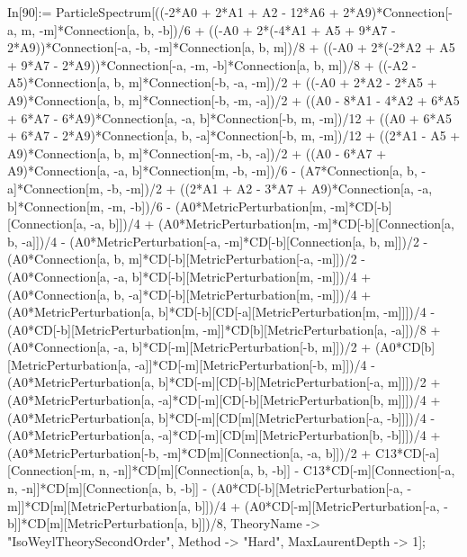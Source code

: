 In[90]:= ParticleSpectrum[((-2*A0 + 2*A1 + A2 - 12*A6 + 2*A9)*Connection[-a, m, -m]*Connection[a, b, -b])/6 + ((-A0 + 2*(-4*A1 + A5 + 9*A7 - 2*A9))*Connection[-a, -b, -m]*Connection[a, b, m])/8 + ((-A0 + 2*(-2*A2 + A5 + 9*A7 - 2*A9))*Connection[-a, -m, -b]*Connection[a, b, m])/8 + ((-A2 - A5)*Connection[a, b, m]*Connection[-b, -a, -m])/2 + ((-A0 + 2*A2 - 2*A5 + A9)*Connection[a, b, m]*Connection[-b, -m, -a])/2 + ((A0 - 8*A1 - 4*A2 + 6*A5 + 6*A7 - 6*A9)*Connection[a, -a, b]*Connection[-b, m, -m])/12 + ((A0 + 6*A5 + 6*A7 - 2*A9)*Connection[a, b, -a]*Connection[-b, m, -m])/12 + ((2*A1 - A5 + A9)*Connection[a, b, m]*Connection[-m, -b, -a])/2 + ((A0 - 6*A7 + A9)*Connection[a, -a, b]*Connection[m, -b, -m])/6 - (A7*Connection[a, b, -a]*Connection[m, -b, -m])/2 + ((2*A1 + A2 - 3*A7 + A9)*Connection[a, -a, b]*Connection[m, -m, -b])/6 - (A0*MetricPerturbation[m, -m]*CD[-b][Connection[a, -a, b]])/4 + (A0*MetricPerturbation[m, -m]*CD[-b][Connection[a, b, -a]])/4 - (A0*MetricPerturbation[-a, -m]*CD[-b][Connection[a, b, m]])/2 - (A0*Connection[a, b, m]*CD[-b][MetricPerturbation[-a, -m]])/2 - (A0*Connection[a, -a, b]*CD[-b][MetricPerturbation[m, -m]])/4 + (A0*Connection[a, b, -a]*CD[-b][MetricPerturbation[m, -m]])/4 + (A0*MetricPerturbation[a, b]*CD[-b][CD[-a][MetricPerturbation[m, -m]]])/4 - (A0*CD[-b][MetricPerturbation[m, -m]]*CD[b][MetricPerturbation[a, -a]])/8 + (A0*Connection[a, -a, b]*CD[-m][MetricPerturbation[-b, m]])/2 + (A0*CD[b][MetricPerturbation[a, -a]]*CD[-m][MetricPerturbation[-b, m]])/4 - (A0*MetricPerturbation[a, b]*CD[-m][CD[-b][MetricPerturbation[-a, m]]])/2 + (A0*MetricPerturbation[a, -a]*CD[-m][CD[-b][MetricPerturbation[b, m]]])/4 + (A0*MetricPerturbation[a, b]*CD[-m][CD[m][MetricPerturbation[-a, -b]]])/4 - (A0*MetricPerturbation[a, -a]*CD[-m][CD[m][MetricPerturbation[b, -b]]])/4 + (A0*MetricPerturbation[-b, -m]*CD[m][Connection[a, -a, b]])/2 + C13*CD[-a][Connection[-m, n, -n]]*CD[m][Connection[a, b, -b]] - C13*CD[-m][Connection[-a, n, -n]]*CD[m][Connection[a, b, -b]] - (A0*CD[-b][MetricPerturbation[-a, -m]]*CD[m][MetricPerturbation[a, b]])/4 + (A0*CD[-m][MetricPerturbation[-a, -b]]*CD[m][MetricPerturbation[a, b]])/8, TheoryName -> "IsoWeylTheorySecondOrder", Method -> "Hard", MaxLaurentDepth -> 1]; 